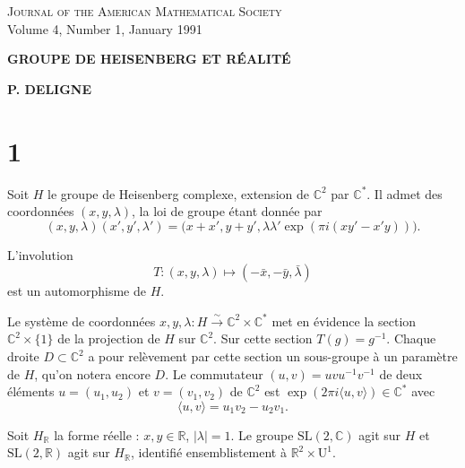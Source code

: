 \documentclass[12pt,a4paper]{article}
\theoremstyle{plain}
\theoremstyle{definition}
\theoremstyle{remark}
\begin{document}
\begin{center}
\small\textsc{Journal of the American Mathematical Society}\\
\small Volume 4, Number 1, January 1991
\end{center}

\vspace{1em}

\begin{center}
\Large\textbf{GROUPE DE HEISENBERG ET RÉALITÉ}
\end{center}

\begin{center}
\textbf{P. DELIGNE}
\end{center}

\vspace{1em}

\section*{1}

Soit $H$ le groupe de Heisenberg complexe, extension de $\mathbb{C}^2$ par $\mathbb{C}^*$. Il admet des coordonnées $(x, y, \lambda)$, la loi de groupe étant donnée par
\begin{equation}\label{eq:1.1}
(x, y, \lambda)(x', y', \lambda') = \bigl(x + x', y + y', \lambda\lambda'\exp(\pi i(xy' - x'y))\bigr).\tag{1.1}
\end{equation}

L'involution
\begin{equation}\label{eq:1.2}
T \colon (x, y, \lambda) \mapsto (-\bar{x}, -\bar{y}, \bar{\lambda})\tag{1.2}
\end{equation}
est un automorphisme de $H$.

Le système de coordonnées $x, y, \lambda \colon H \xrightarrow{\sim} \mathbb{C}^2 \times \mathbb{C}^*$ met en évidence la section $\mathbb{C}^2 \times \{1\}$ de la projection de $H$ sur $\mathbb{C}^2$. Sur cette section $T(g) = g^{-1}$. Chaque droite $D \subset \mathbb{C}^2$ a pour relèvement par cette section un sous-groupe à un paramètre de $H$, qu'on notera encore $D$. Le commutateur $(u, v) = uvu^{-1}v^{-1}$ de deux éléments $u = (u_1, u_2)$ et $v = (v_1, v_2)$ de $\mathbb{C}^2$ est $\exp(2\pi i\langle u, v \rangle) \in \mathbb{C}^*$ avec
\begin{equation}\label{eq:1.3}
\langle u, v \rangle = u_1v_2 - u_2v_1.\tag{1.3}
\end{equation}

Soit $H_\mathbb{R}$ la forme réelle : $x, y \in \mathbb{R}$, $|\lambda| = 1$. Le groupe $\mathrm{SL}(2, \mathbb{C})$ agit sur $H$ et $\mathrm{SL}(2, \mathbb{R})$ agit sur $H_\mathbb{R}$, identifié ensemblistement à $\mathbb{R}^2 \times \mathrm{U}^1$.
\end{document}
